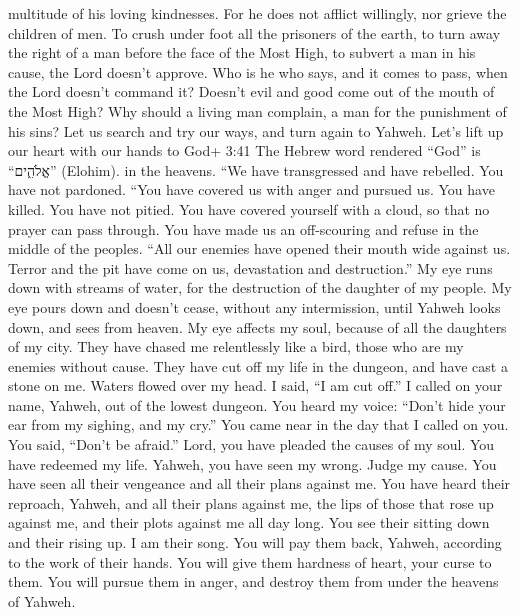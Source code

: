 multitude of his loving kindnesses.  For he does not
afflict willingly, nor grieve the children of men.  To
crush under foot all the prisoners of the earth,  to turn
away the right of a man before the face of the Most High, 
to subvert a man in his cause, the Lord doesn't approve. 
Who is he who says, and it comes to pass, when the Lord doesn't command
it?  Doesn't evil and good come out of the mouth of the
Most High?  Why should a living man complain, a man for the
punishment of his sins?  Let us search and try our ways,
and turn again to Yahweh.  Let's lift up our heart with our
hands to God+ 3:41 The Hebrew word rendered ``God'' is ``אֱלֹהִ֑ים''
(Elohim). in the heavens.  ``We have transgressed and have
rebelled. You have not pardoned.  ``You have covered us
with anger and pursued us. You have killed. You have not pitied.
 You have covered yourself with a cloud, so that no prayer
can pass through.  You have made us an off-scouring and
refuse in the middle of the peoples.  ``All our enemies
have opened their mouth wide against us.  Terror and the
pit have come on us, devastation and destruction.''  My eye
runs down with streams of water, for the destruction of the daughter of
my people.  My eye pours down and doesn't cease, without
any intermission,  until Yahweh looks down, and sees from
heaven.  My eye affects my soul, because of all the
daughters of my city.  They have chased me relentlessly
like a bird, those who are my enemies without cause.  They
have cut off my life in the dungeon, and have cast a stone on me.
 Waters flowed over my head. I said, ``I am cut off.''
 I called on your name, Yahweh, out of the lowest dungeon.
 You heard my voice: ``Don't hide your ear from my sighing,
and my cry.''  You came near in the day that I called on
you. You said, ``Don't be afraid.''  Lord, you have pleaded
the causes of my soul. You have redeemed my life.  Yahweh,
you have seen my wrong. Judge my cause.  You have seen all
their vengeance and all their plans against me.  You have
heard their reproach, Yahweh, and all their plans against me,
 the lips of those that rose up against me, and their plots
against me all day long.  You see their sitting down and
their rising up. I am their song.  You will pay them back,
Yahweh, according to the work of their hands.  You will
give them hardness of heart, your curse to them.  You will
pursue them in anger, and destroy them from under the heavens of Yahweh.

